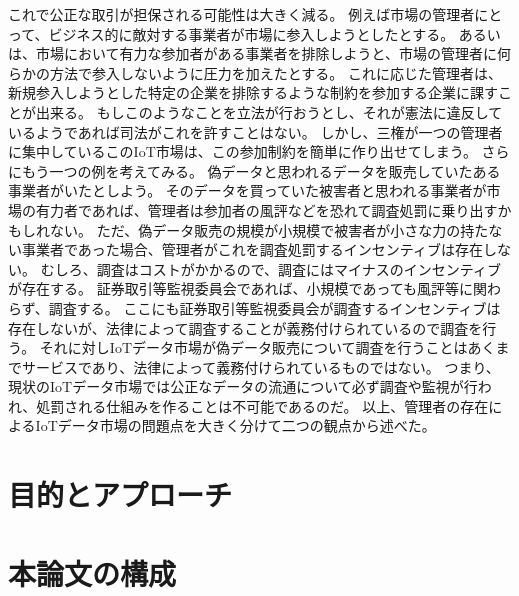これで公正な取引が担保される可能性は大きく減る。
例えば市場の管理者にとって、ビジネス的に敵対する事業者が市場に参入しようとしたとする。
あるいは、市場において有力な参加者がある事業者を排除しようと、市場の管理者に何らかの方法で参入しないように圧力を加えたとする。
これに応じた管理者は、新規参入しようとした特定の企業を排除するような制約を参加する企業に課すことが出来る。
もしこのようなことを立法が行おうとし、それが憲法に違反しているようであれば司法がこれを許すことはない。
しかし、三権が一つの管理者に集中しているこのIoT市場は、この参加制約を簡単に作り出せてしまう。
さらにもう一つの例を考えてみる。
偽データと思われるデータを販売していたある事業者がいたとしよう。
そのデータを買っていた被害者と思われる事業者が市場の有力者であれば、管理者は参加者の風評などを恐れて調査処罰に乗り出すかもしれない。
ただ、偽データ販売の規模が小規模で被害者が小さな力の持たない事業者であった場合、管理者がこれを調査処罰するインセンティブは存在しない。
むしろ、調査はコストがかかるので、調査にはマイナスのインセンティブが存在する。
証券取引等監視委員会であれば、小規模であっても風評等に関わらず、調査する。
ここにも証券取引等監視委員会が調査するインセンティブは存在しないが、法律によって調査することが義務付けられているので調査を行う。
それに対しIoTデータ市場が偽データ販売について調査を行うことはあくまでサービスであり、法律によって義務付けられているものではない。
つまり、現状のIoTデータ市場では公正なデータの流通について必ず調査や監視が行われ、処罰される仕組みを作ることは不可能であるのだ。
以上、管理者の存在によるIoTデータ市場の問題点を大きく分けて二つの観点から述べた。

\section{目的とアプローチ}
\section{本論文の構成}